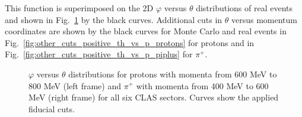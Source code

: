 This function is superimposed on the 2D $\varphi$ versus $\theta$ distributions of real events and shown in Fig.~\ref{fig:eother_cuts_positive_fiduch_2d} by the black curves.
Additional cuts in $\theta$ versus momentum coordinates are shown by the black curves for Monte Carlo and real events in Fig.~\ref{fig:other_cuts_positive_th_vs_p_protons} for protons and in Fig.~\ref{fig:other_cuts_positive_th_vs_p_piplus} for $\pi^{+}$.





\begin{figure}[htp]
\begin{center}
\begin{minipage}{.49\textwidth}
\end{minipage}
\begin{minipage}{.49\textwidth}
\end{minipage}
\caption{\small $\varphi$ versus $\theta$ distributions for protons with momenta from 600 MeV to 800 MeV (left frame) and $\pi^{+}$ with momenta from 400 MeV to 600 MeV (right frame) for all six CLAS sectors. Curves show the applied fiducial cuts. \label{fig:eother_cuts_positive_fiduch_2d}}
\end{center}
\end{figure}





